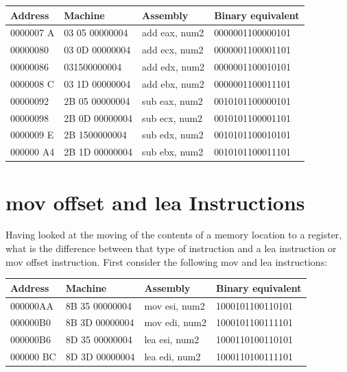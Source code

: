 \documentclass[10pt]{book}
\begin{document}
\begin{center}
\begin{tabular}{|l|l|l|l|}
\hline
Address & Machine & Assembly & Binary equivalent \\
\hline
0000007 A & 03 05 00000004 & add eax, num2 & 0000001100000101 \\
\hline
00000080 & 03 0D 00000004 & add ecx, num2 & 0000001100001101 \\
\hline
00000086 & 031500000004 & add edx, num2 & 0000001100010101 \\
\hline
0000008 C & 03 1D 00000004 & add ebx, num2 & 0000001100011101 \\
\hline
00000092 & 2B 05 00000004 & sub eax, num2 & 0010101100000101 \\
\hline
00000098 & 2B 0D 00000004 & sub ecx, num2 & 0010101100001101 \\
\hline
0000009 E & 2B 1500000004 & sub edx, num2 & 0010101100010101 \\
\hline
000000 A4 & 2B 1D 00000004 & sub ebx, num2 & 0010101100011101 \\
\hline
\end{tabular}
\end{center}

\section{mov offset and lea Instructions}
Having looked at the moving of the contents of a memory location to a register, what is the difference between that type of instruction and a lea instruction or mov offset instruction. First consider the following mov and lea instructions:

\begin{center}
\begin{tabular}{|l|l|l|l|}
\hline
Address & Machine & Assembly & Binary equivalent \\
\hline
000000AA & 8B 35 00000004 & mov esi, num2 & 1000101100110101 \\
\hline
000000B0 & 8B 3D 00000004 & mov edi, num2 & 1000101100111101 \\
\hline
000000B6 & 8D 35 00000004 & lea esi, num2 & 1000110100110101 \\
\hline
000000 BC & 8D 3D 00000004 & lea edi, num2 & 1000110100111101 \\
\hline
\end{tabular}
\end{center}
\end{document}
